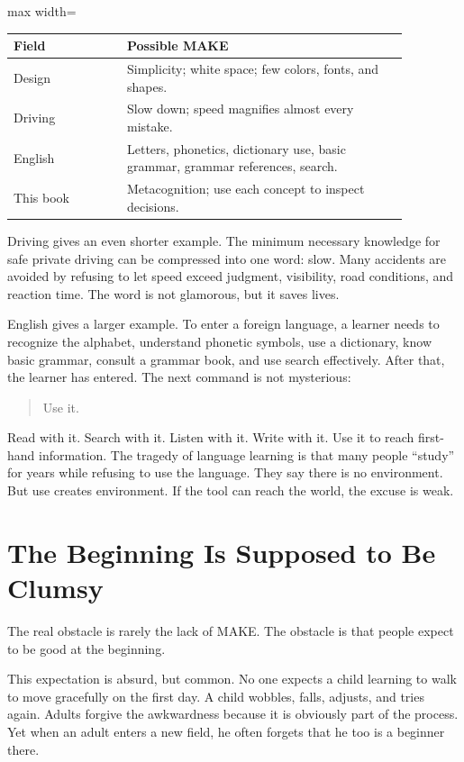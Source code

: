 \begin{center}
\begin{adjustbox}{max width=\linewidth}
\begin{tabular}{p{0.25\linewidth}p{0.62\linewidth}}
\hline
Field & Possible MAKE \\
\hline
Design & Simplicity; white space; few colors, fonts, and shapes. \\
Driving & Slow down; speed magnifies almost every mistake. \\
English & Letters, phonetics, dictionary use, basic grammar, grammar references, search. \\
This book & Metacognition; use each concept to inspect decisions. \\
\hline
\end{tabular}
\end{adjustbox}
\end{center}

Driving gives an even shorter example. The minimum necessary knowledge for safe private driving can be compressed into one word: slow. Many accidents are avoided by refusing to let speed exceed judgment, visibility, road conditions, and reaction time. The word is not glamorous, but it saves lives.

English gives a larger example. To enter a foreign language, a learner needs to recognize the alphabet, understand phonetic symbols, use a dictionary, know basic grammar, consult a grammar book, and use search effectively. After that, the learner has entered. The next command is not mysterious:

\begin{quote}
Use it.
\end{quote}

Read with it. Search with it. Listen with it. Write with it. Use it to reach first-hand information. The tragedy of language learning is that many people ``study'' for years while refusing to use the language. They say there is no environment. But use creates environment. If the tool can reach the world, the excuse is weak.

\section*{The Beginning Is Supposed to Be Clumsy}

The real obstacle is rarely the lack of MAKE. The obstacle is that people expect to be good at the beginning.

This expectation is absurd, but common. No one expects a child learning to walk to move gracefully on the first day. A child wobbles, falls, adjusts, and tries again. Adults forgive the awkwardness because it is obviously part of the process. Yet when an adult enters a new field, he often forgets that he too is a beginner there.

